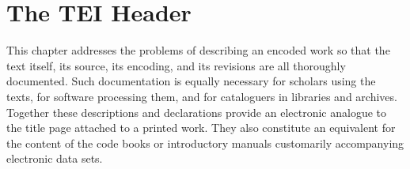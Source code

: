 
\section[{The TEI Header}]{The TEI Header}\label{HD}\par
This chapter addresses the problems of describing an encoded work so that the text itself, its source, its encoding, and its revisions are all thoroughly documented. Such documentation is equally necessary for scholars using the texts, for software processing them, and for cataloguers in libraries and archives. Together these descriptions and declarations provide an electronic analogue to the title page attached to a printed work. They also constitute an equivalent for the content of the code books or introductory manuals customarily accompanying electronic data sets.\par

